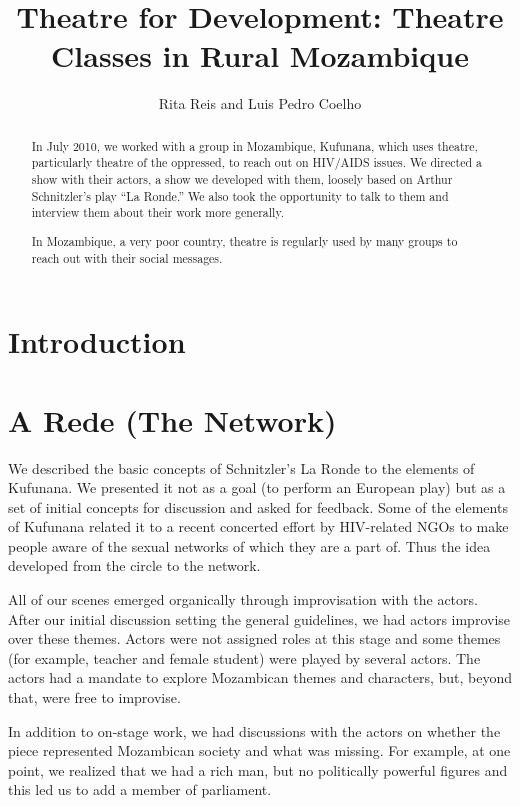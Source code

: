 \documentclass[article,twocolumn,twoside]{memoir}
\title{Theatre for Development: Theatre Classes in Rural Mozambique}
\author{Rita Reis and Luis Pedro Coelho}
\begin{document}
\maketitle

\begin{abstract}
In July 2010, we worked with a group in Mozambique, Kufunana, which uses
theatre, particularly theatre of the oppressed, to reach out on HIV/AIDS
issues. We directed a show with their actors, a show we developed with them,
loosely based on Arthur Schnitzler's play ``La Ronde.'' We also took the
opportunity to talk to them and interview them about their work more generally.

In Mozambique, a very poor country, theatre is regularly used by many groups to
reach out with their social messages.

\end{abstract}

\chapter{Introduction}

\chapter{A Rede (The Network)}
We described the basic concepts of Schnitzler's La Ronde to the elements of
Kufunana. We presented it not as a goal (to perform an European play) but as a
set of initial concepts for discussion and asked for feedback. Some of the
elements of Kufunana related it to a recent concerted effort by HIV-related
NGOs to make people aware of the sexual networks of which they are a part of.
Thus the idea developed from the circle to the network.

All of our scenes emerged organically through improvisation with the actors.
After our initial discussion setting the general guidelines, we had actors
improvise over these themes. Actors were not assigned roles at this stage and
some themes (for example, teacher and female student) were played by several
actors. The actors had a mandate to explore Mozambican themes and characters,
but, beyond that, were free to improvise.

In addition to on-stage work, we had discussions with the actors on whether the
piece represented Mozambican society and what was missing. For example, at one
point, we realized that we had a rich man, but no politically powerful figures
and this led us to add a member of parliament.
\end{document}
